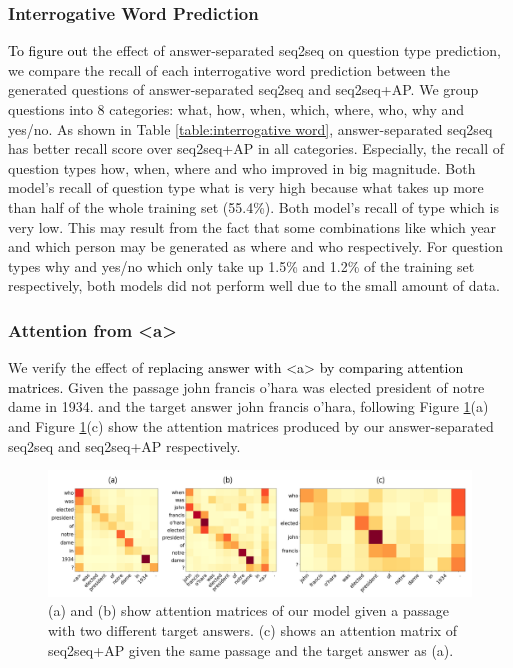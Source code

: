 \documentclass[letterpaper]{article} %
\newcommand{\hh}[1]{\textcolor{black}{#1}}
\begin{document}
\subsubsection{Interrogative Word Prediction}
\hh{To figure out} the effect of answer-separated seq2seq on question type prediction, we compare the recall of each interrogative word prediction between the generated questions of answer-separated seq2seq and seq2seq+AP. We group questions into 8 categories: what, how, when, which, where, who, why and yes/no. As shown in Table \ref{table:interrogative word}, answer-separated seq2seq has better recall score over seq2seq+AP in all categories. Especially, the recall of question types how, when, where and who improved in big magnitude. Both model's recall of question type what is very high because what takes up more than half of the whole training set (55.4\%). Both model's recall of type which is very low. This may result from the fact that some combinations like which year and which person may be generated as where and who respectively. For question types why and yes/no which only take up 1.5\% and 1.2\% of the training set respectively, both models did not perform well due to the small amount of data.
% 
% 
% 
% 
% 
% 


\subsubsection{Attention from \textless a\textgreater{} }
We verify the effect of \hh{replacing answer with \textless a\textgreater{} by comparing attention matrices.} Given the passage  john francis o'hara was elected president of notre dame in 1934. and the target answer  john francis o'hara, following Figure \ref{fig:compare_attention}(a) and Figure \ref{fig:compare_attention}(c) show the attention matrices produced by our answer-separated seq2seq and seq2seq+AP respectively. 
% 
% 

\begin{figure}[!htb]
	\centering
  	\includegraphics[width = \textwidth ]{attention_compare_final.png}
	\caption{(a) and (b) show attention matrices of our model given a passage with two different target answers. (c) shows an attention matrix of seq2seq+AP given the same passage and the target answer as (a).}
  	\label{fig:compare_attention}
\end{figure}
\end{document}
